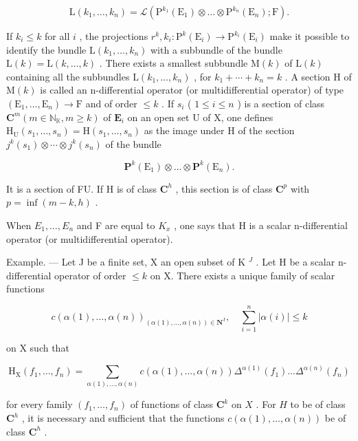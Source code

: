 \[
\mathrm{L} (k _ {1}, \dots , k _ {n}) = \mathscr {L} (\mathrm{P} ^ {k _ {1}} (\mathrm{E} _ {1}) \otimes \dots \otimes \mathrm{P} ^ {k _ {n}} (\mathrm{E} _ {n}); \mathrm{F}).
\]

If \(k_i \leqslant k\) for all \(i\) , the projections \(r^k, k_i: \mathrm{P}^k(\mathrm{E}_i) \to \mathrm{P}^{k_i}(\mathrm{E}_i)\) make it possible to identify the bundle \(\mathrm{L}(k_1, \ldots, k_n)\) with a subbundle of the bundle \(\mathrm{L}(k) = \mathrm{L}(k, \ldots, k)\) . There exists a smallest subbundle \(\mathrm{M}(k)\) of \(\mathrm{L}(k)\) containing all the subbundles \(\mathrm{L}(k_1, \ldots, k_n)\) , for \(k_1 + \cdots + k_n = k\) . A section \(\mathrm{H}\) of \(\mathrm{M}(k)\) is called an n-differential operator (or multidifferential operator) of type \((\mathrm{E}_1, \ldots, \mathrm{E}_n) \to \mathrm{F}\) and of order \(\leqslant k\) . If \(s_i\) ( \(1 \leqslant i \leqslant n\) ) is a section of class \(\mathbf{C}^m (m \in \mathbb{N}_{\mathbb{K}}, m \geqslant k)\) of \(\mathbf{E}_i\) on an open set U of X, one defines \(\mathrm{H}_{\mathrm{U}}(s_1, \ldots, s_n) = \mathrm{H}(s_1, \ldots, s_n)\) as the image under H of the section \(j^k(s_1) \otimes \cdots \otimes j^k(s_n)\) of the bundle

\[
\mathbf {P} ^ {k} (\mathrm{E} _ {1}) \otimes \dots \otimes \mathbf {P} ^ {k} (\mathrm{E} _ {n}).
\]

It is a section of F\textbar U. If H is of class \(\mathbf{C}^h\) , this section is of class \(\mathbf{C}^p\) with \(p = \inf(m - k, h)\) .

When \(E_{1}, \ldots, E_{n}\) and F are equal to \(K_{x}\) , one says that H is a scalar n-differential operator (or multidifferential operator).

Example. --- Let J be a finite set, X an open subset of K \(^{J}\) . Let H be a scalar n-differential operator of order \(\leqslant k\) on X. There exists a unique family of scalar functions

\[
c (\alpha (1), \dots , \alpha (n)) _ {(\alpha (1), \dots , \alpha (n)) \in \mathbf {N} ^ {\mathrm{J}}}, \quad \sum_ {i = 1} ^ {n} | \alpha (i) | \leqslant k
\]

on X such that

\[
\mathrm{H} _ {\mathrm{X}} \left(f _ {1}, \dots , f _ {n}\right) = \sum_ {\alpha (1), \dots , \alpha (n)} c (\alpha (1), \dots , \alpha (n)) \Delta^ {\alpha (1)} \left(f _ {1}\right) \dots \Delta^ {\alpha (n)} \left(f _ {n}\right)
\]

for every family \((f_1, \ldots, f_n)\) of functions of class \(\mathbf{C}^k\) on \(X\) . For \(H\) to be of class \(\mathbf{C}^h\) , it is necessary and sufficient that the functions \(c(\alpha(1), \ldots, \alpha(n))\) be of class \(\mathbf{C}^h\) .

